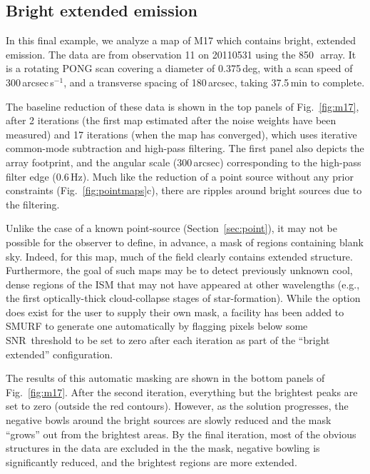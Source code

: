 \documentclass[useAMS,usenatbib,nofootinbib]{mn2e}
\newcommand{\snr}{SNR}
\begin{document}
\subsection{Bright extended emission}
\label{sec:extended}

In this final example, we analyze a map of M17 which contains bright,
extended emission. The data are from observation 11 on 20110531 using
the 850\,\micron\ array. It is a rotating PONG scan covering a
diameter of 0.375\,deg, with a scan speed of 300\,arcsec\,s$^{-1}$,
and a transverse spacing of 180\,arcsec, taking 37.5\,min to complete.

The baseline reduction of these data is shown in the top panels of
Fig.~\ref{fig:m17}, after 2 iterations (the first map estimated after
the noise weights have been measured) and 17 iterations (when the map
has converged), which uses iterative common-mode subtraction and
high-pass filtering. The first panel also depicts the array footprint,
and the angular scale (300\,arcsec) corresponding to the high-pass
filter edge (0.6\,Hz). Much like the reduction of a point source
without any prior constraints (Fig.~\ref{fig:pointmaps}c), there are
ripples around bright sources due to the filtering.

Unlike the case of a known point-source (Section~\ref{sec:point}), it
may not be possible for the observer to define, in advance, a mask of
regions containing blank sky. Indeed, for this map, much of the field
clearly contains extended structure. Furthermore, the goal of such
maps may be to detect previously unknown cool, dense regions of the
ISM that may not have appeared at other wavelengths (e.g., the first
optically-thick cloud-collapse stages of star-formation). While the
option does exist for the user to supply their own mask, a facility
has been added to SMURF to generate one automatically by flagging
pixels below some \snr\ threshold to be set to zero after each
iteration as part of the ``bright extended'' configuration.

The results of this automatic masking are shown in the bottom panels
of Fig.~\ref{fig:m17}. After the second iteration, everything but the
brightest peaks are set to zero (outside the red contours). However,
as the solution progresses, the negative bowls around the bright
sources are slowly reduced and the mask ``grows'' out from the
brightest areas. By the final iteration, most of the obvious
structures in the data are excluded in the the mask, negative bowling
is significantly reduced, and the brightest regions are more extended.
\end{document}
